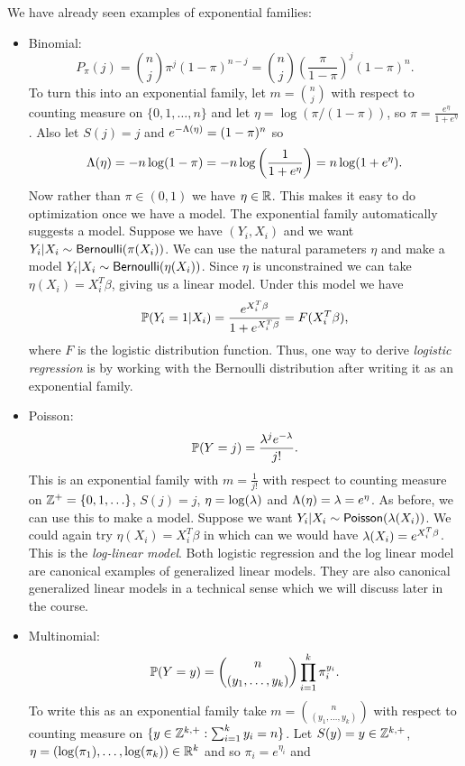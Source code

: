 \begin{examples}
    We have already seen examples of exponential families:
    \begin{itemize}
        \item Binomial:
        \[P_\pi(j) = \binom{n}{j}\pi^j (1-\pi)^{n-j} =\binom{n}{j}\left(\frac{\pi}{1-\pi}\right)^j(1-\pi)^{n}. \]
        To turn this into an exponential family, let $m = \binom{n}{j}$ with respect to counting measure on $\{0,1,\ldots,n\}$ and let $\eta = \log(\pi/(1-\pi))$, so $\pi = \frac{e^\eta}{1+e^{\eta}}$. Also let $S(j)=j$ and $e^{-\Lambda(\eta)} =(1-\pi)^n$ so 
        \[\Lambda(\eta) = -n\log(1-\pi)=-n\log\left(\frac{1}{1+e^{\eta}}\right)=n\log(1+e^{\eta}).\]
        Now rather than $\pi \in (0,1)$ we have $\eta \in {\mathbb R}$. This makes it easy to do optimization once we have a model. The exponential family automatically suggests a model. Suppose we have $(Y_i,X_i)$ and we want $Y_i |X_i \sim \mathsf{Bernoulli}(\pi(X_i))$. We can use the natural parameters $\eta$ and make a model $Y_i |X_i \sim \mathsf{Bernoulli}(\eta(X_i))$. Since $\eta$ is unconstrained we can take $\eta(X_i) = X_i^T\beta$, giving us a linear model. Under this model we have
        \[{\mathbb{P}}(Y_i=1|X_i) = \frac{e^{X_i^T\beta}}{1+e^{X_i^T\beta}} = F(X_i^T\beta), \]
        where $F$ is the logistic distribution function. Thus, one way to derive \emph{logistic regression} is by working with the Bernoulli distribution after writing it as an exponential family.
        \item Poisson:
        \[{\mathbb{P}}(Y = j) = \frac{\lambda^j e^{-\lambda}}{j!}.\] 
        This is an exponential family with $m= \frac{1}{j!}$ with respect to counting measure on ${{\mathbb Z}}^+=\{0,1,\ldots \}$, $S(j)=j$, $\eta = \log(\lambda)$ and $\Lambda(\eta)=\lambda = e^{\eta}$. As before, we can use this to make a model. Suppose we want $Y_i|X_i \sim \mathsf{Poisson}(\lambda(X_i))$. We could again try $\eta(X_i)=X_i^T\beta$ in which can we would have $\lambda(X_i) = e^{X_i^T\beta}$. This is the \emph{log-linear model}. Both logistic regression and the log linear model are canonical examples of generalized linear models. They are also canonical generalized linear models in a technical sense which we will discuss later in the course.
        \item Multinomial: 
        \[{\mathbb{P}}(Y=y) = \binom{n}{(y_1,\ldots,y_k)}\prod_{i=1}^k \pi_i^{y_i}.\] To write this as an exponential family take $m=\binom{n}{(y_1,\ldots,y_k)}$ with respect to counting measure on $\{y \in {{\mathbb Z}}^{k,+}: \sum_{i=1}^k y_i = n\}$. Let $S(y)=y \in {{\mathbb Z}}^{k,+}$, $\eta = (\log(\pi_1),\ldots,\log(\pi_k)) \in {\mathbb R}^k$ and so $\pi_i = e^{\eta_i}$ and 

\end{itemize}
\end{examples}
